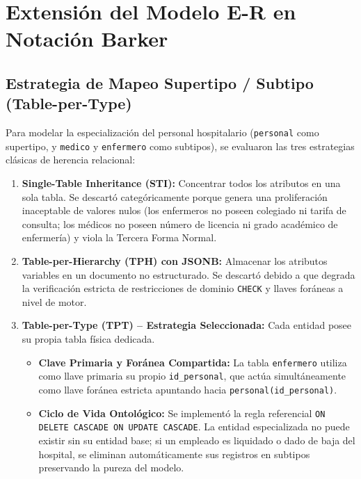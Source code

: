 \documentclass[11pt,a4paper]{article}
\begin{document}
\newpage

\section{Extensión del Modelo E-R en Notación Barker}

\subsection{Estrategia de Mapeo Supertipo / Subtipo (Table-per-Type)}
Para modelar la especialización del personal hospitalario (\texttt{personal} como supertipo, y \texttt{medico} y \texttt{enfermero} como subtipos), se evaluaron las tres estrategias clásicas de herencia relacional:
\begin{enumerate}
	\item \textbf{Single-Table Inheritance (STI):} Concentrar todos los atributos en una sola tabla. Se descartó categóricamente porque genera una proliferación inaceptable de valores nulos (los enfermeros no poseen colegiado ni tarifa de consulta; los médicos no poseen número de licencia ni grado académico de enfermería) y viola la Tercera Forma Normal.
	\item \textbf{Table-per-Hierarchy (TPH) con JSONB:} Almacenar los atributos variables en un documento no estructurado. Se descartó debido a que degrada la verificación estricta de restricciones de dominio \texttt{CHECK} y llaves foráneas a nivel de motor.
	\item \textbf{Table-per-Type (TPT) -- Estrategia Seleccionada:} Cada entidad posee su propia tabla física dedicada.
	\begin{itemize}
		\item \textbf{Clave Primaria y Foránea Compartida:} La tabla \texttt{enfermero} utiliza como llave primaria su propio \texttt{id\_personal}, que actúa simultáneamente como llave foránea estricta apuntando hacia \texttt{personal(id\_personal)}.
		\item \textbf{Ciclo de Vida Ontológico:} Se implementó la regla referencial \texttt{ON DELETE CASCADE ON UPDATE CASCADE}. La entidad especializada no puede existir sin su entidad base; si un empleado es liquidado o dado de baja del hospital, se eliminan automáticamente sus registros en subtipos preservando la pureza del modelo.
	\end{itemize}
\end{enumerate}
\end{document}
